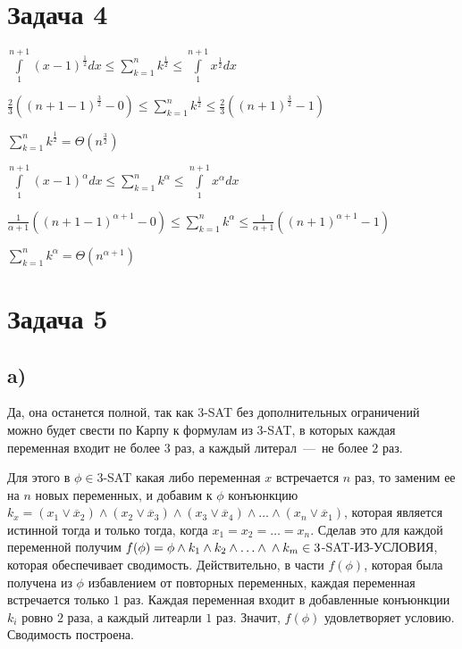 \documentclass[a4paper,12pt]{article} %
\begin{document}
\section{Задача 4}
\hspace{5mm}
$\int\limits^{n+1}_1 (x-1)^{\frac{1}{2}}dx\leq \sum\limits^n_{k=1}k^{\frac{1}{2}}\leq\int\limits^{n+1}_1 x^{\frac{1}{2}} dx$

$\frac{2}{3}((n+1-1)^\frac{3}{2}-0)\leq \sum\limits^n_{k=1}k^{\frac{1}{2}}\leq \frac{2}{3}((n+1)^\frac{3}{2}-1)$

$\sum\limits^n_{k=1}k^{\frac{1}{2}}=\Theta(n^\frac{3}{2})$

$\int\limits^{n+1}_1 (x-1)^{\alpha}dx\leq \sum\limits^n_{k=1}k^{\alpha}\leq\int\limits^{n+1}_1 x^{\alpha} dx$

$\frac{1}{\alpha+1}((n+1-1)^{\alpha+1}-0)\leq \sum\limits^n_{k=1}k^{\alpha}\leq \frac{1}{\alpha+1}((n+1)^{\alpha+1}-1)$

$\sum\limits^n_{k=1}k^{\alpha}=\Theta(n^{\alpha+1})$

\section{Задача 5}
\subsection{a)}
\hspace{5mm}
Да, она останется полной, так как $3$-SAT без дополнительных ограничений можно будет свести по Карпу к формулам из $3$-SAT, в которых каждая переменная входит не более $3$ раз, а каждый литерал~---~не более $2$ раз.

Для этого в $\phi\in3$-SAT какая либо переменная $x$ встречается $n$ раз, то заменим ее на $n$ новых переменных, и добавим к $\phi$ конъюнкцию $k_x=(x_1\vee \overline x_2)\wedge(x_2\vee \overline x_3)\wedge(x_3\vee \overline x_4)\wedge\ldots\wedge(x_{n}\vee \overline x_1)$, которая является истинной тогда и только тогда, когда $x_1=x_2=\ldots=x_n$. Сделав это для каждой переменной получим $f(\phi)=\phi\wedge k_1\wedge k_2\wedge\ldots\wedge\\
\wedge k_m\in3$-SAT-ИЗ-УСЛОВИЯ, которая обеспечивает сводимость. Действительно, в части $f(\phi)$, которая была получена из $\phi$ избавлением от повторных переменных, каждая переменная встречается только $1$ раз. Каждая переменная входит в добавленные конъюнкции $k_i$ ровно $2$ раза, а каждый литеарли $1$ раз. Значит, $f(\phi)$ удовлетворяет условию. Сводимость построена.
\end{document}

